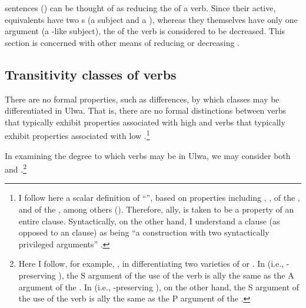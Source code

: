 sentences () can be thought of as reducing the  of a verb. Since their  active,  equivalents have two s (a subject and a ), whereas they themselves have only one argument (a -like subject), the  of the verb is considered to be decreased. This section is concerned with other means of reducing  or decreasing .


\subsection{Transitivity classes of verbs}\label{sec:13.8.1}


  There are no formal properties, such as  differences, by which  classes may be differentiated in Ulwa. That is, there are no formal distinctions between verbs that typically exhibit  properties associated with high  and verbs that typically exhibit  properties associated with low .\footnote{I follow here a scalar definition of “”, based on  properties including , ,  of the , and  of the , among others (\citealt{HopperThompson1980}). Therefore, ally,  is taken to be a property of an entire clause. Syntactically, on the other hand, I understand a  clause (as opposed to an \linebreak {} clause) as being “a construction with two syntactically privileged arguments” \citep[6]{Næss2007}.}

In examining the degree to which verbs may be  in Ulwa, we may consider both  and .\footnote{Here I follow, for example, \citet[109]{Kibrik1996}, in differentiating two varieties of  or . In  (i.e., -preserving ), the S argument of the  use of the verb is ally the same as the A argument of the . In  (i.e., -preserving ), on the other hand, the S argument of the  use of the verb is ally the same as the P argument of the .}

